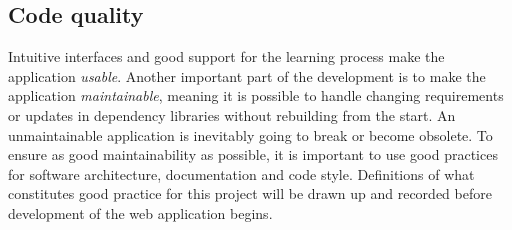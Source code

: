 \subsection{Code quality}

Intuitive interfaces and good support for the learning process make the application \textit{usable}. Another important part of the development is to make the application \textit{maintainable}, meaning it is possible to handle changing requirements or updates in dependency libraries without rebuilding from the start. An unmaintainable application is inevitably going to break or become obsolete. To ensure as good maintainability as possible, it is important to use good practices for software architecture, documentation and code style. Definitions of what constitutes good practice for this project will be drawn up and recorded before development of the web application begins.
